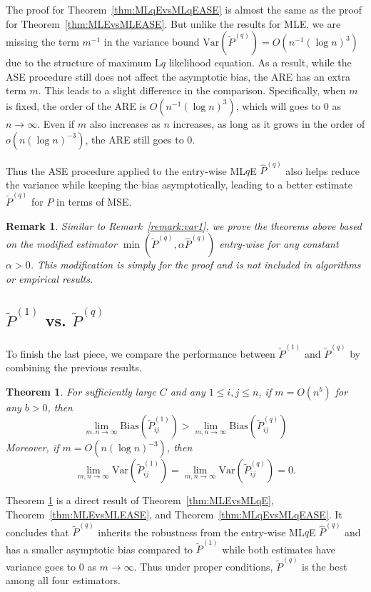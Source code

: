 \documentclass[a4paper]{article}
\newtheorem{theorem}[fact]{Theorem}
\newtheorem{remark}[fact]{Remark}
\renewcommand{\hat}{\widehat}
\begin{document}
The proof for Theorem~\ref{thm:MLqEvsMLqEASE} is almost the same as the proof for Theorem~\ref{thm:MLEvsMLEASE}. But unlike the results for MLE, we are missing the term $m^{-1}$ in the variance bound $\mathrm{Var}(\widetilde{P}^{(q)}) = O(n^{-1} (\log n)^3)$ due to the structure of maximum L$q$ likelihood equation. As a result, while the ASE procedure still does not affect the asymptotic bias, the ARE has an extra term $m$. This leads to a slight difference in the comparison. Specifically, when $m$ is fixed, the order of the ARE is $O(n^{-1} (\log n)^3)$, which will goes to 0 as $n \to \infty$. Even if $m$ also increases as $n$ increases, as long as it grows in the order of $o(n (\log n)^{-3})$, the ARE still goes to 0. 

Thus the ASE procedure applied to the entry-wise ML$q$E $\hat{P}^{(q)}$ also helps reduce the variance while keeping the bias asymptotically, leading to a better estimate $\widetilde{P}^{(q)}$ for $P$ in terms of MSE.

\begin{remark}
Similar to Remark~\ref{remark:var1}, we prove the theorems above based on the modified estimator $\min(\widetilde{P}^{(q)}, \alpha \hat{P}^{(q)})$ entry-wise for any constant $\alpha > 0$. This modification is simply for the proof and is not included in algorithms or empirical results.
\end{remark}

\subsection{$\widetilde{P}^{(1)}$ vs. $\widetilde{P}^{(q)}$}

To finish the last piece, we compare the performance between $\widetilde{P}^{(1)}$ and $\widetilde{P}^{(q)}$ by combining the previous results.

\begin{theorem}
\label{thm:MLEASEvsMLqEASE}
For sufficiently large $C$ and any $1 \le i,j \le n$, if $m = O(n^b)$ for any $b > 0$, then
\[
	\lim_{m, n \to \infty} \mathrm{Bias}(\widetilde{P}_{ij}^{(1)})
    > \lim_{m, n \to \infty} \mathrm{Bias}(\widetilde{P}_{ij}^{(q)})
\]
Moreover, if $m = O(n (\log n)^{-3})$, then
\[
	\lim_{m, n \to \infty} \mathrm{Var}(\widetilde{P}_{ij}^{(1)})
    = \lim_{m, n \to \infty} \mathrm{Var}(\widetilde{P}_{ij}^{(q)}) = 0.
\]
\end{theorem}

Theorem \ref{thm:MLEASEvsMLqEASE} is a direct result of Theorem~\ref{thm:MLEvsMLqE}, Theorem~\ref{thm:MLEvsMLEASE}, and Theorem~\ref{thm:MLqEvsMLqEASE}.
It concludes that $\widetilde{P}^{(q)}$ inherits the robustness from the entry-wise ML$q$E $\hat{P}^{(q)}$ and has a smaller asymptotic bias compared to $\widetilde{P}^{(1)}$ while both estimates have variance goes to 0 as $m \to \infty$. Thus under proper conditions, $\widetilde{P}^{(q)}$ is the best among all four estimators.
\end{document}
